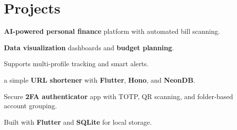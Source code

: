 \documentclass[]{deedy-resume-reversed}
\begin{document}
\begin{minipage}[t]{0.60\textwidth}
\section{Projects}

\begin{tightemize}
\item \textbf{AI-powered personal finance} platform with automated bill scanning.
\item \textbf{Data visualization} dashboards and \textbf{budget planning}.
\item Supports multi-profile tracking and smart alerts.
\end{tightemize}
\sectionsep

\begin{tightemize}
\item a simple \textbf{URL shortener} with \textbf{Flutter}, \textbf{Hono}, and \textbf{NeonDB}.
\end{tightemize}
\sectionsep

\begin{tightemize}
\item Secure \textbf{2FA authenticator} app with TOTP, QR scanning, and folder-based account grouping.
\item Built with \textbf{Flutter} and \textbf{SQLite} for local storage.
\end{tightemize}
\sectionsep

\end{minipage}
\hfill
\end{document}
